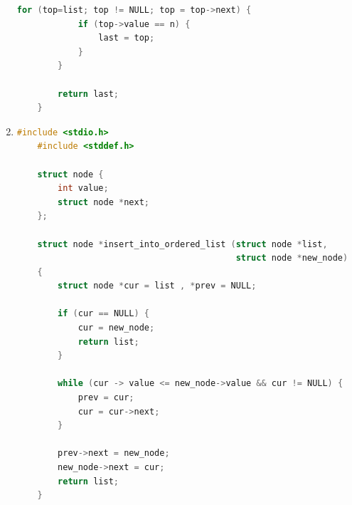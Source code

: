 \documentclass[12pt]{article}
\begin{document}
\begin{enumerate}[1.]
\begin{lstlisting}[language=c]
        for (top=list; top != NULL; top = top->next) {
            if (top->value == n) {
                last = top;
            }
        }

        return last;
    }
\end{lstlisting}

    \item

\begin{lstlisting}[language=c]
    #include <stdio.h>
    #include <stddef.h>

    struct node {
        int value;
        struct node *next;
    };

    struct node *insert_into_ordered_list (struct node *list,
                                           struct node *new_node)
    {
        struct node *cur = list , *prev = NULL;

        if (cur == NULL) {
            cur = new_node;
            return list;
        }

        while (cur -> value <= new_node->value && cur != NULL) {
            prev = cur;
            cur = cur->next;
        }

        prev->next = new_node;
        new_node->next = cur;
        return list;
    }
\end{lstlisting}

\end{enumerate}
\end{document}
